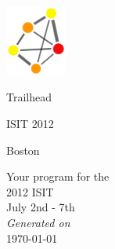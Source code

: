 \documentclass[letterpaper,11pt]{report}
\newcommand{\mytitle}[1]{\Large \LARGE #1\par}
\newcommand{\mysubtitle}[1]{\large #1\par}
\newcommand{\mydate}[1]{\small #1\par}
\begin{document}
\begin{center}

\noindent%
\begin{minipage}[t]{.15\textwidth}
\vspace{0pt}\includegraphics[width=2cm]{img/logo/logo.png}
\end{minipage}%
\begin{minipage}[t]{.2\textwidth}
\vspace{16pt}
\vfill
\mytitle{Trailhead}
\mysubtitle{ISIT 2012}
\mydate{Boston}
\end{minipage}

\Large
\vfill
Your program for the\\
2012 ISIT\\
July 2nd - 7th\\
\vfill
\vfill
\small {\itshape Generated on}\\
\small \today
\end{center}
\thispagestyle{empty}\null\clearpage\setcounter{page}{1}
\end{document}
